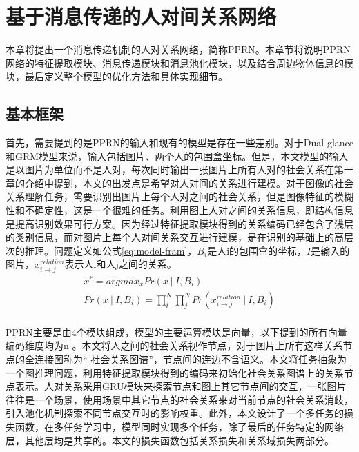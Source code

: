
\chapter{基于消息传递的人对间关系网络}
\label{ch:model}

本章将提出一个消息传递机制的人对关系网络，简称PPRN。本章节将说明PPRN网络的特征提取模块、消息传递模块和消息池化模块，以及结合周边物体信息的模块，最后定义整个模型的优化方法和具体实现细节。


\section{基本框架}
首先，需要提到的是PPRN的输入和现有的模型是存在一些差别。对于Dual-glance和GRM模型来说，输入包括图片、两个人的包围盒坐标。但是，本文模型的输入是以图片为单位而不是人对，每次同时输出一张图片上所有人对的社会关系在第一章的介绍中提到，本文的出发点是希望对人对间的关系进行建模。对于图像的社会关系理解任务，需要识别出图片上每个人对之间的社会关系，但是图像特征的模糊性和不确定性，这是一个很难的任务。利用图上人对之间的关系信息，即结构信息是提高识别效果可行方案。因为经过特征提取模块得到的关系编码已经包含了浅层的类别信息，而对图片上每个人对间关系交互进行建模，是在识别的基础上的高层次的推理。问题定义如公式\ref{eq:model-fram}，$B_{i}$是人i的包围盒的坐标，$I$是输入的图片，$x_{i \rightarrow j}^{relation}$表示人i和人j之间的关系。
\begin{equation} \label{eq:model-fram}
\begin{split}
    x^{*} = argmax_{x}Pr(x~|~I,B_{i}) \\
    Pr(x~|~I,B_{i}) = \prod_{i}^{N}\prod_{j}^{N}Pr(x_{i \rightarrow j}^{relation}~|~I,B_{i}) \\
\end{split}
\end{equation}

PPRN主要是由4个模块组成，模型的主要运算模块是向量，以下提到的所有向量编码维度均为n 。本文将人之间的社会关系视作节点，对于图片上所有这样关系节点的全连接图称为`` 社会关系图谱''，节点间的连边不含语义。本文将任务抽象为一个图推理问题，利用特征提取模块得到的编码来初始化社会关系图谱上的关系节点表示。人对关系采用GRU模块来探索节点和图上其它节点间的交互，一张图片往往是一个场景，使用场景中其它节点的社会关系来对当前节点的社会关系消歧，引入池化机制探索不同节点交互时的影响权重。此外，本文设计了一个多任务的损失函数，在多任务学习中，模型同时实现多个任务，除了最后的任务特定的网络层，其他层均是共享的。本文的损失函数包括关系损失和关系域损失两部分。


